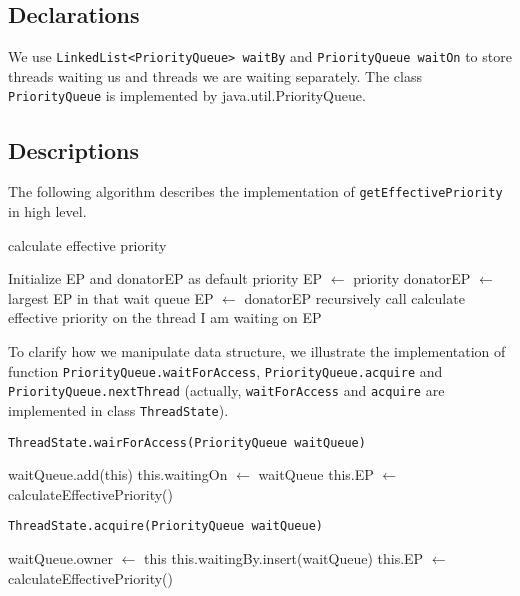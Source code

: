 \documentclass{article}
\begin{document}
\begin{spacing}{1.1}
\subsection{Declarations}

We use \texttt{LinkedList<PriorityQueue> waitBy} and \texttt{PriorityQueue waitOn} to store threads waiting us and threads we are waiting separately. The class \texttt{PriorityQueue} is implemented by java.util.PriorityQueue.

\subsection{Descriptions}

The following algorithm describes the implementation of \texttt{getEffectivePriority} in high level.

\begin{algorithm}
  \caption{calculate effective priority}
\begin{algorithmic}[1]
  \STATE Initialize EP and donatorEP as default priority
  \STATE EP $\leftarrow$ priority
  \STATE donatorEP $\leftarrow$ largest EP in that wait queue
    \STATE EP $\leftarrow$ donatorEP
  \ENDIF
\ENDFOR
\STATE recursively call calculate effective priority on the thread I am waiting on
\RETURN EP
\end{algorithmic}
\end{algorithm}

To clarify how we manipulate data structure, we illustrate the implementation of function \linebreak \texttt{PriorityQueue.waitForAccess}, \texttt{PriorityQueue.acquire} and \texttt{PriorityQueue.nextThread} (actually, \linebreak \texttt{waitForAccess} and \texttt{acquire} are implemented in class \texttt{ThreadState}).

\begin{algorithm}
  \caption{\texttt{ThreadState.wairForAccess(PriorityQueue waitQueue)}}
\begin{algorithmic}[1]
  \STATE waitQueue.add(this)  
  \STATE this.waitingOn $\leftarrow$ waitQueue  
  \STATE this.EP $\leftarrow$ calculateEffectivePriority()  
\RETURN 
\end{algorithmic}
\end{algorithm}

\begin{algorithm}
  \caption{\texttt{ThreadState.acquire(PriorityQueue waitQueue)}}
\begin{algorithmic}[1]
  \STATE waitQueue.owner $\leftarrow$ this
  \STATE this.waitingBy.insert(waitQueue)
  \STATE this.EP $\leftarrow$ calculateEffectivePriority()  
\RETURN 
\end{algorithmic}
\end{algorithm}


\end{spacing}
\end{document}
